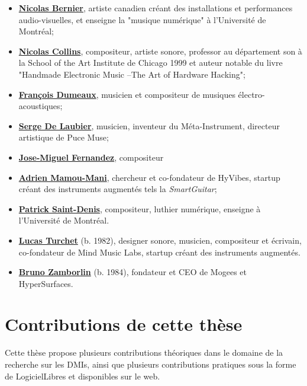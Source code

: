 \vspace{-1em}
\begin{itemize}[noitemsep]
\item \textbf{\hyperref[appendix:bernier]{Nicolas Bernier}}, artiste canadien créant des installations et performances audio-visuelles, et enseigne la "musique numérique" à l'Université de Montréal;
\item \textbf{\hyperref[appendix:collins]{Nicolas Collins}}, compositeur, artiste sonore, professor au département son  à la School of the Art Institute de Chicago 1999 et auteur notable du livre "Handmade Electronic Music –The Art of Hardware Hacking";
\item \textbf{\hyperref[appendix:dumeaux]{François Dumeaux}}, musicien et compositeur de musiques électro-acoustiques;
\item \textbf{\hyperref[appendix:delaubier]{Serge De Laubier}}, musicien, inventeur du Méta-Instrument, directeur artistique de Puce Muse;
\item \textbf{\hyperref[appendix:fernandez]{Jose-Miguel Fernandez}}, compositeur 
\item \textbf{\hyperref[appendix:mamou-mani]{Adrien Mamou-Mani}}, chercheur et co-fondateur de HyVibes, startup créant des instruments augmentés tels la \textit{SmartGuitar};
\item \textbf{\hyperref[appendix:saint-denis]{Patrick Saint-Denis}}, compositeur, luthier numérique, enseigne à l'Université de Montréal.
\item \textbf{\hyperref[appendix:turchet]{Lucas Turchet}} (b. 1982), designer sonore, musicien, compositeur et écrivain, co-fondateur de Mind Music Labs, startup créant des instruments augmentés.
\item \textbf{\hyperref[appendix:zamborlin]{Bruno Zamborlin}} (b. 1984), fondateur et CEO de Mogees et HyperSurfaces. 
\end{itemize}



\section{Contributions de cette thèse}

Cette thèse propose plusieurs contributions théoriques dans le domaine de la recherche sur les \glspl{DMI}, ainsi que plusieurs contributions pratiques sous la forme de \glspl{LogicielLibre} et disponibles sur le web.

